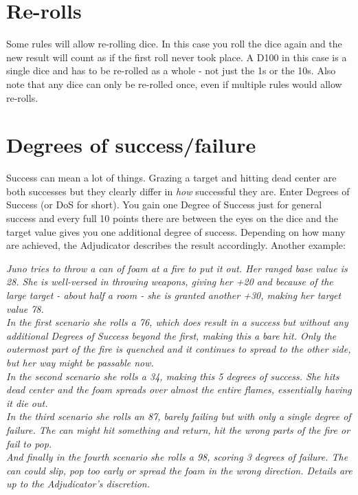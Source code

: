 \documentclass[11pt,a4paper,openany,dvipsnames]{book}
\begin{document}
	\section{Re-rolls}
	Some rules will allow re-rolling dice. In this case you roll the dice again and the new result will count as if the first roll never took place. A D100 in this case is a single dice and has to be re-rolled as a whole - not just the 1s or the 10s.
	Also note that any dice can only be re-rolled once, even if multiple rules would allow re-rolls.
	\section{Degrees of success/failure}
	Success can mean a lot of things.
	Grazing a target and hitting dead center are both successes
		but they clearly differ in \emph{how} successful they are.
	Enter Degrees of Success (or DoS for short).
	You gain one Degree of Success just for general success
		and every full 10 points there are between the eyes on the dice
		and the target value gives you one additional degree of success.
	Depending on how many are achieved, the Adjudicator describes the result accordingly.
	Another example:

	\begin{exampleblock}
		\itshape
		Juno tries to throw a can of foam at a fire to put it out.
		Her ranged base value is 28.
		She is well-versed in throwing weapons,
			giving her +20 and because of the large target
			- about half a room - she is granted another +30,
			making her target value 78.\\
		In the first scenario she rolls a 76,
			which does result in a success but without any additional Degrees of Success beyond the first,
			making this a bare hit.
		Only the outermost part of the fire is quenched
			and it continues to spread to the other side,
			but her way might be passable now.\\
		In the second scenario she rolls a 34,
			making this 5 degrees of success.
		She hits dead center and the foam spreads over almost the entire flames,
			essentially having it die out.\\
		In the third scenario she rolls an 87,
			barely failing but with only a single degree of failure.
		The can might hit something and return,
			hit the wrong parts of the fire or fail to pop.\\
		And finally in the fourth scenario she rolls a 98,
			scoring 3 degrees of failure.
		The can could slip, pop too early or spread the foam in the wrong direction.
		Details are up to the Adjudicator's discretion.
	\end{exampleblock}
\end{document}
